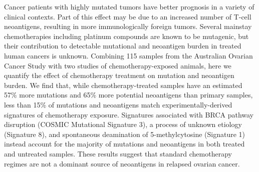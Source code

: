 Cancer patients with highly mutated tumors have better prognosis in a variety of clinical contexts. Part of this effect may be due to an increased number of T-cell neoantigens, resulting in more immunologically foreign tumors. Several mainstay chemotherapies including platinum compounds are known to be mutagenic, but their contribution to detectable mutational and neoantigen burden in treated human cancers is unknown. Combining 115 samples from the Australian Ovarian Cancer Study with two studies of chemotherapy-exposed animals, here we quantify the effect of chemotherapy treatment on mutation and neoantigen burden. We find that, while chemotherapy-treated samples have an estimated 57\% more mutations and 65\% more potential neoantigens than primary samples, less than 15\% of mutations and neoantigens match experimentally-derived signatures of chemotherapy exposure. Signatures associated with BRCA pathway disruption (COSMIC Mutational Signature 3), a process of unknown etiology (Signature 8), and spontaneous deamination of 5-methylcytosine (Signature 1) instead account for the majority of mutations and neoantigens in both treated and untreated samples. These results suggest that standard chemotherapy regimes are not a dominant source of neoantigens in relapsed ovarian cancer.

